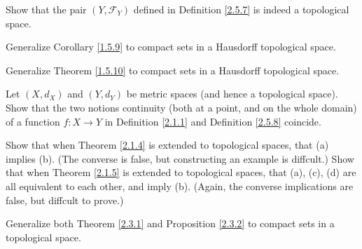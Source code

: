 \begin{exercise}\label{ex 2.5.12}
    Show that the pair \((Y, \mathcal{F}_Y)\) defined in Definition \ref{2.5.7} is indeed a topological space.
\end{exercise}

\begin{exercise}\label{ex 2.5.13}
    Generalize Corollary \ref{1.5.9} to compact sets in a Hausdorff topological space.
\end{exercise}

\begin{exercise}\label{ex 2.5.14}
    Generalize Theorem \ref{1.5.10} to compact sets in a Hausdorff topological space.
\end{exercise}

\begin{exercise}\label{ex 2.5.15}
    Let \((X, d_X)\) and \((Y, d_Y)\) be metric spaces (and hence a topological space).
    Show that the two notions continuity (both at a point, and on the whole domain) of a function \(f : X \to Y\) in Definition \ref{2.1.1} and Definition \ref{2.5.8} coincide.
\end{exercise}

\begin{exercise}\label{ex 2.5.16}
    Show that when Theorem \ref{2.1.4} is extended to topological spaces, that (a) implies (b).
    (The converse is false, but constructing an example is diffcult.)
    Show that when Theorem \ref{2.1.5} is extended to topological spaces, that (a), (c), (d) are all equivalent to each other, and imply (b).
    (Again, the converse implications are false, but diffcult to prove.)
\end{exercise}

\begin{exercise}\label{ex 2.5.17}
    Generalize both Theorem \ref{2.3.1} and Proposition \ref{2.3.2} to compact sets in a topological space.
\end{exercise}